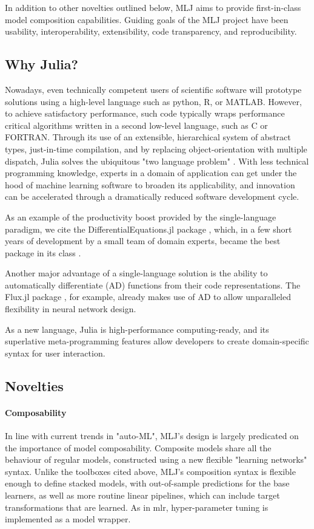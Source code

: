 \documentclass{article}
\begin{document}
In addition to other novelties outlined below, MLJ aims to provide
first-in-class model composition capabilities. Guiding goals of the
MLJ project have been usability, interoperability, extensibility, code
transparency, and reproducibility.

\subsection{Why Julia?}

Nowadays, even technically competent users of scientific software will
prototype solutions using a high-level language such as python, R, or
MATLAB. However, to achieve satisfactory performance, such code
typically wraps performance critical algorithms written in a second
low-level language, such as C or FORTRAN. Through its use of an
extensible, hierarchical system of abstract types, just-in-time
compilation, and by replacing object-orientation with multiple
dispatch, Julia solves the ubiquitous "two language problem"
\cite{BezansonEtal2017}. With less technical programming knowledge,
experts in a domain of application can get under the hood of machine
learning software to broaden its applicability, and innovation can be
accelerated through a dramatically reduced software development cycle.

As an example of the productivity boost provided by the
single-language paradigm, we cite the DifferentialEquations.jl package
\cite{RackauckasNie2017}, which, in a few short years of development
by a small team of domain experts, became the best package in its
class \cite{Rackauckas2017}.

Another major advantage of a single-language solution is the ability
to automatically differentiate (AD) functions from their code
representations. The Flux.jl package \cite{Innes2018}, for example,
already makes use of AD to allow unparalleled flexibility in neural
network design.

As a new language, Julia is high-performance computing-ready, and its
superlative meta-programming features allow developers to create
domain-specific syntax for user interaction.

\subsection{Novelties}

\paragraph{Composability} In line with current trends in "auto-ML",
MLJ's design is largely predicated on the importance of model
composability. Composite models share all the behaviour of regular
models, constructed using a new flexible "learning networks"
syntax. Unlike the toolboxes cited above, MLJ's composition syntax is
flexible enough to define stacked models, with out-of-sample
predictions for the base learners, as well as more routine linear
pipelines, which can include target transformations that are
learned. As in mlr, hyper-parameter tuning is implemented as a model
wrapper.
\end{document}

